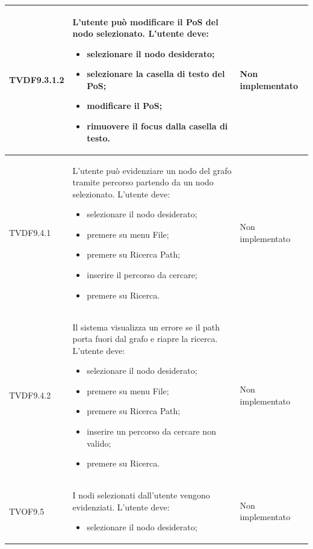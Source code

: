 \documentclass[openany,12pt,a4paper]{report}
\begin{document}
\begin{longtable}{| p{2cm} |p{5cm} | p{2.5cm} |}
	\newline TVDF9.3.1.2&
	\newline L'utente può modificare il PoS del nodo selezionato. L'utente deve:
	\begin{itemize}
		\item selezionare il nodo desiderato;
		\item selezionare la casella di testo del PoS;
		\item modificare il PoS;
		\item rimuovere il focus dalla casella di testo.
	\end{itemize}&
	\newline Non implementato
	\\[1em]
	\hline
	
	\newline TVDF9.4.1&
	\newline L'utente può evidenziare un nodo del grafo tramite percorso partendo da un nodo selezionato. L'utente deve:
	\begin{itemize}
		\item selezionare il nodo desiderato;
		\item premere su menu File;
		\item premere su Ricerca Path;
		\item inserire il percorso da cercare;
		\item premere su Ricerca.
	\end{itemize}&
	\newline Non implementato
	\\[1em]
	\hline
	
	\newline TVDF9.4.2&
	\newline Il sistema visualizza un errore se il path porta fuori dal grafo e riapre la ricerca. L'utente deve:
	\begin{itemize}
		\item selezionare il nodo desiderato;
		\item premere su menu File;
		\item premere su Ricerca Path;
		\item inserire un percorso da cercare non valido;
		\item premere su Ricerca.
	\end{itemize}&
	\newline Non implementato
	\\[1em]
	\hline
	
	\newline TVOF9.5&
	\newline I nodi selezionati dall'utente vengono evidenziati. L'utente deve:
	\begin{itemize}
		\item selezionare il nodo desiderato;
	\end{itemize}&
	\newline Non implementato
	\\[1em]
	\hline
	

\end{longtable}
\end{document}
